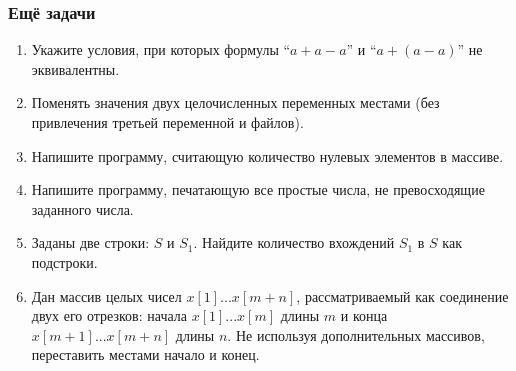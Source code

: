 \documentclass{../../slides-style}
\begin{document}
    \begin{frame}
        \frametitle{Ещё задачи}
        \begin{enumerate}
            \item Укажите условия, при которых формулы ``$a + a - a$'' и ``$a + (a - a)$'' не эквивалентны.
            \item Поменять значения двух целочисленных переменных местами (без привлечения третьей переменной и файлов).
            \item Напишите программу, считающую количество нулевых элементов в массиве.
            \item Напишите программу, печатающую все простые числа, не превосходящие заданного числа.
            \item Заданы две строки: $S$ и $S_1$. Найдите количество вхождений $S_1$ в $S$ как подстроки.
            \item Дан массив целых чисел $x[1]...x[m+n]$, рассматриваемый как соединение двух его отрезков: начала $x[1]...x[m]$ длины $m$ и конца $x[m+1]...x[m+n]$ длины $n$. Не используя дополнительных массивов, переставить местами начало и конец.
        \end{enumerate}
    \end{frame}
\end{document}
